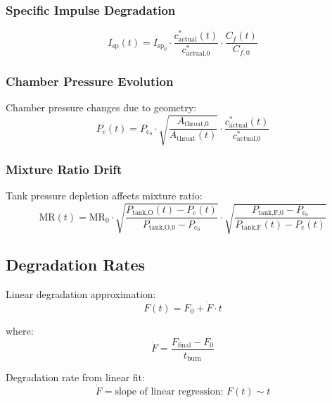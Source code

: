 \documentclass[12pt,a4paper]{article}
\newcommand{\Pc}{P_{\text{c}}}
\newcommand{\cstar}{c^{*}}
\newcommand{\Isp}{I_{\text{sp}}}
\newcommand{\MR}{\text{MR}}
\begin{document}
\subsubsection{Specific Impulse Degradation}

\begin{equation}
\Isp(t) = \Isp_0 \cdot \frac{\cstar_{\text{actual}}(t)}{\cstar_{\text{actual,0}}} \cdot \frac{C_f(t)}{C_{f,0}}
\end{equation}

\subsubsection{Chamber Pressure Evolution}

Chamber pressure changes due to geometry:
\begin{equation}
\Pc(t) = \Pc_0 \cdot \sqrt{\frac{A_{\text{throat,0}}}{A_{\text{throat}}(t)}} \cdot \frac{\cstar_{\text{actual}}(t)}{\cstar_{\text{actual,0}}}
\end{equation}

\subsubsection{Mixture Ratio Drift}

Tank pressure depletion affects mixture ratio:
\begin{equation}
\MR(t) = \MR_0 \cdot \sqrt{\frac{P_{\text{tank,O}}(t) - \Pc(t)}{P_{\text{tank,O,0}} - \Pc_0}} \cdot \sqrt{\frac{P_{\text{tank,F,0}} - \Pc_0}{P_{\text{tank,F}}(t) - \Pc(t)}}
\end{equation}

\subsection{Degradation Rates}

Linear degradation approximation:
\begin{equation}
F(t) = F_0 + \dot{F} \cdot t
\end{equation}

where:
\begin{equation}
\dot{F} = \frac{F_{\text{final}} - F_0}{t_{\text{burn}}}
\end{equation}

Degradation rate from linear fit:
\begin{equation}
\dot{F} = \text{slope of linear regression: } F(t) \sim t
\end{equation}
\end{document}
